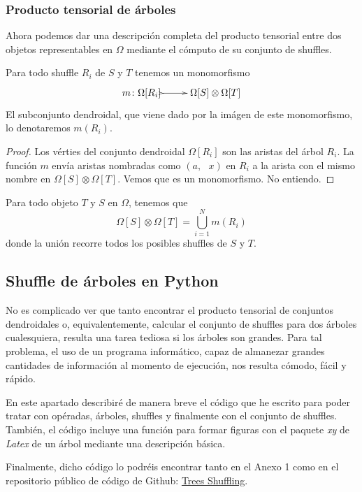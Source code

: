 \documentclass[../main.tex]{subfiles}
\begin{document}
\subsubsection*{Producto tensorial de \'arboles}
Ahora podemos dar una descripci\'on completa del producto tensorial entre dos objetos representables en $\Omega$ mediante el c\'omputo de su conjunto de shuffles.
\begin{lema}
    Para todo shuffle $R_i$ de $S$ y $T$ tenemos un monomorfismo
    $$
        \xymatrix{
            m\colon\Omega[R_i] \ar@{>->}[r] & \Omega[S]\otimes\Omega[T]
        }
    $$
    El subconjunto dendroidal, que viene dado por la im\'agen de este monomorfismo, lo denotaremos $m(R_i)$.
\end{lema}
\begin{proof}
    Los v\'erties del conjunto dendroidal $\Omega[R_i]$ son las aristas del \'arbol $R_i$. La funci\'on $m$ env\'ia aristas nombradas como $(a,\text{ }x)$ en $R_i$ a la arista con el mismo nombre en $\Omega[S]\otimes\Omega[T]$.
    Vemos que es un monomorfismo.
    No entiendo.
\end{proof}
\begin{corol}
    Para todo objeto $T$ y $S$ en $\Omega$, tenemos que
    $$
        \Omega[S]\otimes\Omega[T] = \bigcup_{i=1}^{N} m(R_i)
    $$
    donde la uni\'on recorre todos los posibles shuffles de $S$ y $T$.
\end{corol}

\subsection{Shuffle de \'arboles en Python}
No es complicado ver que tanto encontrar el producto tensorial de conjuntos dendroidales o, equivalentemente, calcular el conjunto de shuffles para dos \'arboles cualesquiera, resulta una tarea tediosa si los \'arboles son grandes. Para tal problema, el uso de un programa inform\'atico, capaz de almanezar grandes cantidades de informaci\'on al momento de ejecuci\'on, nos resulta c\'omodo, f\'acil y r\'apido.

En este apartado describir\'e de manera breve el c\'odigo que he escrito para poder tratar con op\'eradas, \'arboles, shuffles y finalmente con el conjunto de shuffles. Tambi\'en, el c\'odigo incluye una funci\'on para formar figuras con el paquete \textit{xy} de \textit{Latex} de un \'arbol mediante una descripci\'on b\'asica.

Finalmente, dicho c\'odigo lo podr\'eis encontrar tanto en el Anexo 1 como en el repositorio p\'ublico de c\'odigo de Github: \href{https://github.com/rbrasco/trees-shuffling}{Trees Shuffling}.
\end{document}
